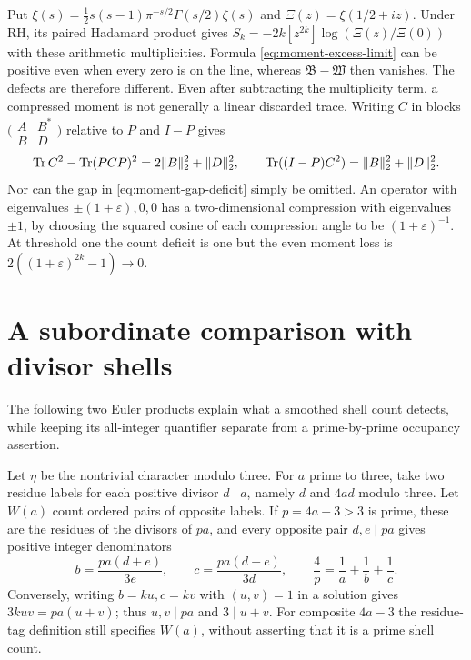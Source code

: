 Put $\xi(s)=\tfrac12s(s-1)\pi^{-s/2}\Gamma(s/2)\zeta(s)$ and
$\Xi(z)=\xi(1/2+iz)$. Under RH, its paired Hadamard product gives
$S_k=-2k[z^{2k}]\log(\Xi(z)/\Xi(0))$ with these arithmetic
multiplicities. Formula \eqref{eq:moment-excess-limit} can be
positive even when every zero is on the line, whereas
$\mathfrak B-\mathfrak W$ then vanishes. The defects are therefore
different. Even after subtracting the multiplicity term, a
compressed moment is not generally a linear discarded trace.
Writing $C$ in blocks $\bigl(\begin{smallmatrix}A&B^*\\B&D\end{smallmatrix}\bigr)$
relative to $P$ and $I-P$ gives
\[
 \operatorname{Tr} C^2-\operatorname{Tr}(PCP)^2=2\|B\|_2^2+\|D\|_2^2,
 \qquad
 \operatorname{Tr}((I-P)C^2)=\|B\|_2^2+\|D\|_2^2.
\]
Nor can the gap in \eqref{eq:moment-gap-deficit} simply be omitted.
An operator with eigenvalues $\pm(1+\varepsilon),0,0$ has a
two-dimensional compression with eigenvalues $\pm1$, by choosing
the squared cosine of each compression angle to be
$(1+\varepsilon)^{-1}$. At threshold one the count deficit is one
but the even moment loss is $2((1+\varepsilon)^{2k}-1)\to0$.

\section{A subordinate comparison with divisor shells}
\label{sec:divisor-shells}
The following two Euler products explain what a smoothed shell
count detects, while keeping its all-integer quantifier separate
from a prime-by-prime occupancy assertion.

Let $\eta$ be the nontrivial character modulo three. For $a$ prime
to three, take two residue labels for each positive divisor
$d\mid a$, namely $d$ and $4ad$ modulo three. Let $W(a)$ count
ordered pairs of opposite labels. If $p=4a-3>3$ is prime, these
are the residues of the divisors of $pa$, and every opposite pair
$d,e\mid pa$ gives positive integer denominators
\[
 b=\frac{pa(d+e)}{3e},\qquad
 c=\frac{pa(d+e)}{3d},\qquad
 \frac4p=\frac1a+\frac1b+\frac1c.
\]
Conversely, writing $b=ku,c=kv$ with $(u,v)=1$ in a solution
gives $3kuv=pa(u+v)$; thus $u,v\mid pa$ and $3\mid u+v$.
For composite $4a-3$ the residue-tag definition still specifies
$W(a)$, without asserting that it is a prime shell count.

